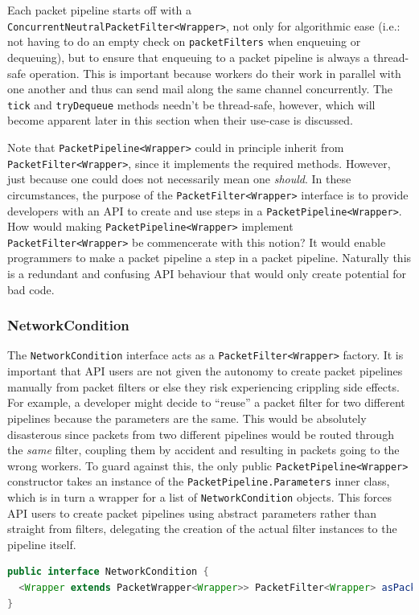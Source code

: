Each packet pipeline starts off with a \texttt{ConcurrentNeutralPacketFilter<Wrapper>}, not only for algorithmic ease
(i.e.: not having to do an empty check on \texttt{packetFilters} when enqueuing or dequeuing), but to ensure that
enqueuing to a packet pipeline is always a thread-safe operation. This is important because workers do their work in
parallel with one another and thus can send mail along the same channel concurrently. The \texttt{tick} and
\texttt{tryDequeue} methods needn't be thread-safe, however, which will become apparent later in this section when
their use-case is discussed.

Note that \texttt{PacketPipeline<Wrapper>} could in principle inherit from \texttt{PacketFilter<Wrapper>}, since it
implements the required methods. However, just because one could does not necessarily mean one \emph{should}. In
these circumstances, the purpose of the \texttt{PacketFilter<Wrapper>} interface is to provide developers with an API
to create and use steps in a \texttt{PacketPipeline<Wrapper>}. How would making \texttt{PacketPipeline<Wrapper>}
implement \texttt{PacketFilter<Wrapper>} be commencerate with this notion? It would enable programmers to make a
packet pipeline a step in a packet pipeline. Naturally this is a redundant and confusing API behaviour that would
only create potential for bad code.

\subsubsection{NetworkCondition}\label{subsubsection:network_condition}

The \texttt{NetworkCondition} interface acts as a \texttt{PacketFilter<Wrapper>} factory. It is important that API
users are not given the autonomy to create packet pipelines manually from packet filters or else they risk
experiencing crippling side effects. For example, a developer might decide to ``reuse'' a packet filter for two
different pipelines because the parameters are the same. This would be absolutely disasterous since packets from two
different pipelines would be routed through the \emph{same} filter, coupling them by accident and resulting in packets
going to the wrong workers. To guard against this, the only public \texttt{PacketPipeline<Wrapper>} constructor takes
an instance of the \texttt{PacketPipeline.Parameters} inner class, which is in turn a wrapper for a list of
\texttt{NetworkCondition} objects. This forces API users to create packet pipelines using abstract parameters rather
than straight from filters, delegating the creation of the actual filter instances to the pipeline itself.
\begin{lstlisting}[language=Java,caption={The \texttt{NetworkCondition} interface without any of its presets.},
    label={code:network_condition_interface},captionpos=b]
public interface NetworkCondition {
  <Wrapper extends PacketWrapper<Wrapper>> PacketFilter<Wrapper> asPacketFilterStartingAt(LocalDateTime startTime);
}
\end{lstlisting}

